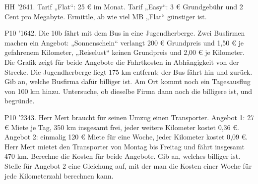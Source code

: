\documentclass[11pt]{article}
\begin{document}
\pfgruppe{}
\begin{pfaufg}{HH ’26}{41.}{}
Tarif „Flat“: 25 € im Monat. Tarif „Easy“: 3 € Grundgebühr und 2 Cent pro Megabyte. Ermittle, ab wie viel MB „Flat“ günstiger ist.
\end{pfaufg}
\pfgruppe{}
\begin{pfaufg}{P10 ’16}{42.}{}
Die 10b fährt mit dem Bus in eine Jugendherberge. Zwei Busfirmen machen ein Angebot: „Sonnenschein“ verlangt 200 € Grundpreis und 1,50 € je gefahrenem Kilometer, „Reiselust“ keinen Grundpreis und 2,00 € je Kilometer. Die Grafik zeigt für beide Angebote die Fahrtkosten in Abhängigkeit von der Strecke. Die Jugendherberge liegt 175 km entfernt; der Bus fährt hin und zurück. Gib an, welche Busfirma dafür billiger ist. Am Ort kommt noch ein Tagesausflug von 100 km hinzu. Untersuche, ob dieselbe Firma dann noch die billigere ist, und begründe.
\par\smallskip\noindent {}
\par\smallskip\noindent {}\par
{}
\end{pfaufg}
\pfgruppe{}
\begin{pfaufg}{P10 ’23}{\llap{\textasteriskcentered\,}43.}{}
Herr Mert braucht für seinen Umzug einen Transporter. Angebot 1: 27 € Miete je Tag, 350 km insgesamt frei, jeder weitere Kilometer kostet 0,36 €. Angebot 2: einmalig 120 € Miete für eine Woche, jeder Kilometer kostet 0,09 €. Herr Mert mietet den Transporter von Montag bis Freitag und fährt insgesamt 470 km. Berechne die Kosten für beide Angebote. Gib an, welches billiger ist. Stelle für Angebot 2 eine Gleichung auf, mit der man die Kosten einer Woche für jede Kilometerzahl berechnen kann.
\end{pfaufg}
\end{document}
